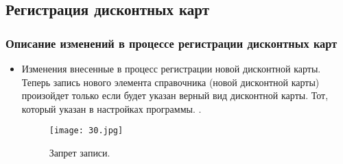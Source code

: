 \subsection{Регистрация дисконтных карт}
\subsubsection{Описание изменений в процессе регистрации дисконтных карт	}
\begin{itemize}	
	\item Изменения внесенные в процесс регистрации новой дисконтной карты. Теперь запись нового элемента справочника (новой дисконтной карты) произойдет только если будет указан верный вид дисконтной карты. Тот, который указан в настройках программы.
		.
	\begin{figure}[H]
		\texttt{[image: 30.jpg]}
		\caption{Запрет записи.}
		\label{ris:30.jpg}
	\end{figure}

\end{itemize}